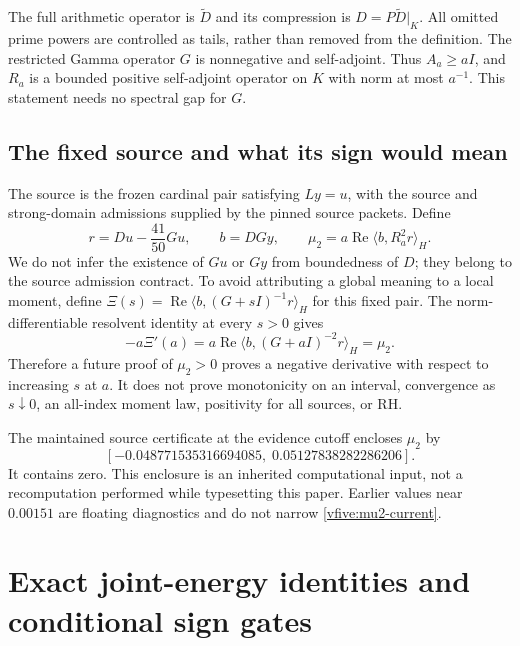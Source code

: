 \documentclass[11pt,a4paper]{article}
\numberwithin{equation}{section}
\theoremstyle{definition}\newtheorem{definition}[theorem]{Definition}
\theoremstyle{remark}\newtheorem{remark}[theorem]{Remark}
\newcommand{\rhip}[2]{\langle#1,#2\rangle_H}
\begin{document}
The full arithmetic operator is $\widetilde D$ and its compression is $D=P\widetilde D|_K$. All omitted prime powers are controlled as tails, rather than removed from the definition. The restricted Gamma operator $G$ is nonnegative and self-adjoint. Thus $A_a\geq aI$, and $R_a$ is a bounded positive self-adjoint operator on $K$ with norm at most $a^{-1}$. This statement needs no spectral gap for $G$.

\subsection{The fixed source and what its sign would mean}
The source is the frozen cardinal pair satisfying $Ly=u$, with the source and strong-domain admissions supplied by the pinned source packets. Define
\[
 r=Du-\frac{41}{50}Gu,\qquad b=DGy,
 \qquad \mu_2=a\operatorname{Re}\rhip{b}{R_a^2r}.
\]
We do not infer the existence of $Gu$ or $Gy$ from boundedness of $D$; they belong to the source admission contract. To avoid attributing a global meaning to a local moment, define $\Xi(s)=\operatorname{Re}\rhip{b}{(G+sI)^{-1}r}$ for this fixed pair. The norm-differentiable resolvent identity at every $s>0$ gives
\[
 -a\Xi'(a)=a\operatorname{Re}\rhip{b}{(G+aI)^{-2}r}=\mu_2.
\]
Therefore a future proof of $\mu_2>0$ proves a negative derivative with respect to increasing $s$ at $a$. It does not prove monotonicity on an interval, convergence as $s\downarrow0$, an all-index moment law, positivity for all sources, or RH.

The maintained source certificate at the evidence cutoff encloses $\mu_2$ by
\begin{equation}\label{vfive:mu2-current}
 [-0.048771535316694085,\;0.05127838282286206].
\end{equation}
It contains zero. This enclosure is an inherited computational input, not a recomputation performed while typesetting this paper. Earlier values near $0.00151$ are floating diagnostics and do not narrow \eqref{vfive:mu2-current}.

\section{Exact joint-energy identities and conditional sign gates}\label{vfive:joint}
\end{document}
